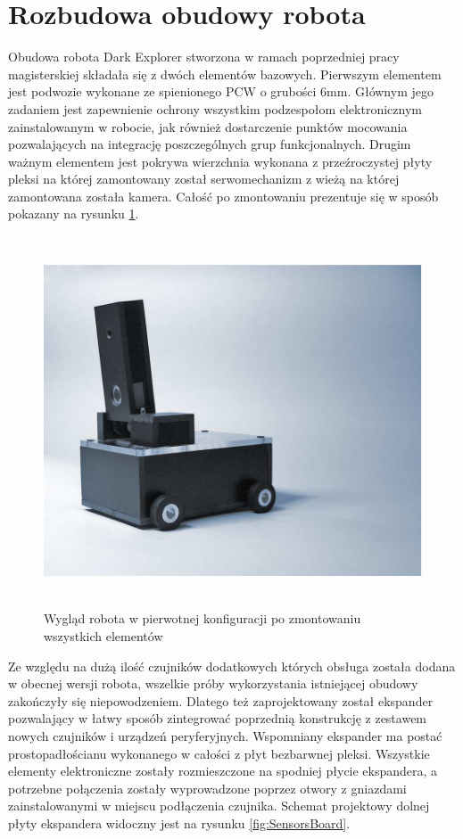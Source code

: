 \section{Rozbudowa obudowy robota}
Obudowa robota Dark Explorer stworzona w ramach poprzedniej pracy magisterskiej
\cite{KmakMScThesis2009} składała się z dwóch elementów bazowych. Pierwszym
elementem jest podwozie wykonane ze spienionego PCW o grubości 6mm. Głównym jego
zadaniem jest zapewnienie ochrony wszystkim podzespołom elektronicznym
zainstalowanym w robocie, jak również dostarczenie punktów mocowania
pozwalających na integrację poszczególnych grup funkcjonalnych. Drugim ważnym
elementem jest pokrywa wierzchnia wykonana z przeźroczystej płyty pleksi na
której zamontowany został serwomechanizm z wieżą na której zamontowana została
kamera. Całość po zmontowaniu prezentuje się w sposób pokazany na rysunku
\ref{fig:DESideView}.

\begin{figure}[ht!]
 \centering
 \includegraphics[height=110mm]{../images/ch04/de_side_view.png}
 \caption{Wygląd robota w pierwotnej konfiguracji po zmontowaniu wszystkich elementów}
 \label{fig:DESideView}
\end{figure}

Ze względu na dużą ilość czujników dodatkowych których obsługa została dodana w
obecnej wersji robota, wszelkie próby wykorzystania istniejącej obudowy
zakończyły się niepowodzeniem. Dlatego też zaprojektowany został ekspander
pozwalający w łatwy sposób zintegrować poprzednią konstrukcję z zestawem nowych
czujników i urządzeń peryferyjnych. Wspomniany ekspander ma postać
prostopadłościanu wykonanego w całości z płyt bezbarwnej pleksi. 
Wszystkie elementy elektroniczne zostały rozmieszczone na spodniej płycie
ekspandera, a potrzebne połączenia zostały wyprowadzone poprzez otwory z
gniazdami zainstalowanymi w miejscu podłączenia czujnika. Schemat projektowy
dolnej płyty ekspandera widoczny jest na rysunku \ref{fig:SensorsBoard}.

